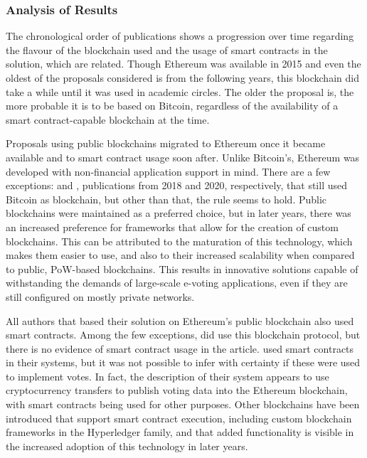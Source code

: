 \documentclass[../access.tex]{subfiles}
\begin{document}
\subsubsection{Analysis of Results}
	\label{results-blockchain-characteristics}
    The chronological order of publications shows a progression over time regarding the flavour of the blockchain used and the usage of smart contracts in the solution, which are related. Though Ethereum was available in 2015 and even the oldest of the proposals considered is from the following years, this blockchain did take a while until it was used in academic circles. The older the proposal is, the more probable it is to be based on Bitcoin, regardless of the availability of a smart contract-capable blockchain at the time.
	\par
    Proposals using public blockchains migrated to Ethereum once it became available and to smart contract usage soon after. Unlike Bitcoin's, Ethereum was developed with non-financial application support in mind. There are a few exceptions: \cite{Bartolucci2018} and \cite{Dimitriou2020}, publications from 2018 and 2020, respectively, that still used Bitcoin as blockchain, but other than that, the rule seems to hold. Public blockchains were maintained as a preferred choice, but in later years, there was an increased preference for frameworks that allow for the creation of custom blockchains. This can be attributed to the maturation of this technology, which makes them easier to use, and also to their increased scalability when compared to public, PoW-based blockchains. This results in innovative solutions capable of withstanding the demands of large-scale e-voting applications, even if they are still configured on mostly private networks.
	\par
    All authors that based their solution on Ethereum's public blockchain also used smart contracts. Among the few exceptions, \cite{Hardwick2018} did use this blockchain protocol, but there is no evidence of smart contract usage in the article. \cite{Lai2018} used smart contracts in their systems, but it was not possible to infer with certainty if these were used to implement votes. In fact, the description of their system appears to use cryptocurrency transfers to publish voting data into the Ethereum blockchain, with smart contracts being used for other purposes. Other blockchains have been introduced that support smart contract execution, including custom blockchain frameworks in the Hyperledger family, and that added functionality is visible in the increased adoption of this technology in later years.
\end{document}
